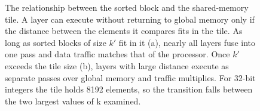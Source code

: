 \begin{figure}[H]
    \caption[Sorted block and shared-memory tile]{The relationship between the sorted block and the shared-memory tile. A
    layer can execute without returning to global memory only if the
    distance between the elements it compares fits in the tile. As long as
    sorted blocks of size $k'$ fit in it (a), nearly all layers fuse into
    one pass and data traffic matches that of the processor. Once
    $k'$ exceeds the tile size (b), layers with large distance
    execute as separate passes over global memory and traffic
    multiplies. For 32-bit integers the tile holds 8192
    elements, so the transition falls between the two largest values of
    k examined.}
    \label{fig:gpu-tiling}
\end{figure}
